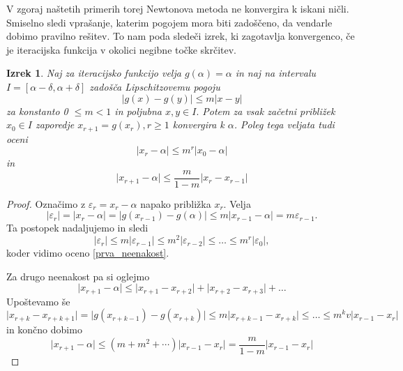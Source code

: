 \documentclass[12pt,a4paper]{amsart}
\theoremstyle{definition} %
\theoremstyle{plain} %
\newtheorem{izrek}[definicija]{Izrek}
\begin{document}
V zgoraj naštetih primerih torej Newtonova metoda ne konvergira k iskani ničli. Smiselno sledi vprašanje, katerim pogojem mora biti zadoščeno, da 
vendarle dobimo pravilno rešitev. To nam poda sledeči izrek, ki zagotavlja konvergenco, če je iteracijska funkcija v okolici negibne točke skrčitev.
\begin{izrek} 
    Naj za iteracijsko funkcijo velja $g(\alpha) = \alpha$ in naj na intervalu $I = [ \alpha - \delta,\alpha + \delta ]$ zadošča Lipschitzovemu pogoju
    \[
        \lvert g(x) - g(y) \rvert \leq m \lvert x - y \rvert
    \]
    za konstanto 0 $\leq m < 1$ in poljubna $x,y \in I.$ Potem za vsak začetni približek $x_{0} \in I$ zaporedje $x_{r+1} = g(x_{r}), r \geq 1$ konvergira k $\alpha$. Poleg tega veljata
    tudi oceni
    \begin{equation}\label{prva_neenakost}
        \lvert x_{r} - \alpha \rvert \leq m^{r}\lvert x_{0} - \alpha \rvert
    \end{equation}
    in
    \begin{equation}
        \lvert x_{r+1} - \alpha \rvert \leq \frac{m}{1-m} \lvert x_{r} - x_{r-1} \rvert
    \end{equation}
\end{izrek}
\begin{proof}
    Označimo z $\varepsilon_{r} = x_{r} - \alpha $ napako približka $x_{r}.$ Velja
    \[
        \lvert \varepsilon_{r} \rvert = \lvert x_{r} - \alpha \rvert = \lvert g(x_{r-1}) - g(\alpha) \rvert \leq m\lvert x_{r-1} - \alpha \rvert = m \varepsilon_{r-1}.
    \]
    Ta postopek nadaljujemo in sledi
    \[
        \lvert \varepsilon_{r} \rvert \leq m \lvert \varepsilon_{r-1} \rvert \leq m^{2} \lvert \varepsilon_{r-2} \rvert \leq \ldots \leq m^{r} \lvert\varepsilon_{0} \rvert,
    \]
    koder vidimo oceno \eqref{prva_neenakost}.

    Za drugo neenakost pa si oglejmo
    \[
        \lvert x_{r+1} - \alpha \rvert \leq \lvert x_{r+1} - x_{r+2} \rvert + \lvert x_{r+2} - x_{r+3} \rvert + \ldots
    \]
    Upoštevamo še
    \[
        \lvert x_{r+k} - x_{r+k+1} \rvert = \lvert g(x_{r+k-1}) - g(x_{r+k}) \rvert \leq m \lvert x_{r+k-1} - x_{r+k} \rvert \leq \ldots \leq m^{k}v\lvert x_{r-1} - x_{r}\rvert 
    \]
    in končno dobimo
    \[
        \lvert x_{r+1} - \alpha\rvert \leq (m + m^2 + \cdots)\lvert x_{r-1} - x_{r}\rvert = \frac{m}{1-m}\lvert x_{r-1} - x_{r}\rvert
    \]
\end{proof}
\end{document}
